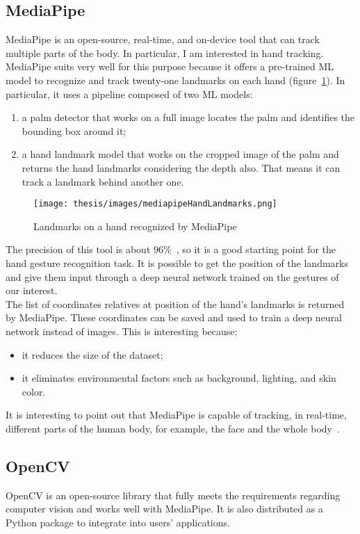 \documentclass[../thesis.tex]{subfiles}
\begin{document}
\subsection{MediaPipe}\label{sec:mediapipe}
MediaPipe is an open-source, real-time, and on-device tool that can track multiple parts of the body. In particular, I am interested in hand tracking. MediaPipe suits very well for this purpose because it offers a pre-trained \acrshort{ML} model to recognize and track twenty-one landmarks on each hand (figure~\ref{fig:landmarksMediapipe}). In particular, it uses a pipeline composed of two \acrshort{ML} models:
\begin{enumerate}
    \item a palm detector that works on a full image locates the palm and identifies the bounding box around it;
    \item a hand landmark model that works on the cropped image of the palm and returns the hand landmarks considering the depth also. That means it can track a landmark behind another one.
\end{enumerate}
\begin{figure}[H]
    \centering
    \texttt{[image: thesis/images/mediapipeHandLandmarks.png]}
    \caption{Landmarks on a hand recognized by MediaPipe~\cite{site:mediapipe}}
    \label{fig:landmarksMediapipe}
\end{figure}
The precision of this tool is about $96\%$~\cite{paper:mediapipe}, so it is a good starting point for the hand gesture recognition task. It is possible to get the position of the landmarks and give them input through a deep neural network trained on the gestures of our interest. \\
The list of coordinates relatives at position of the hand's landmarks is returned by MediaPipe. These coordinates can be saved and used to train a deep neural network instead of images. This is interesting because: 
\begin{itemize}
    \item it reduces the size of the dataset;
    \item it eliminates environmental factors such as background, lighting, and skin color.
\end{itemize}

It is interesting to point out that MediaPipe is capable of tracking, in real-time, different parts of the human body, for example, the face and the whole body~\cite{site:mediapipe}.

\subsection{OpenCV}
OpenCV is an open-source library that fully meets the requirements regarding computer vision and works well with MediaPipe. It is also distributed as a Python package to integrate into users' applications. 
\end{document}
